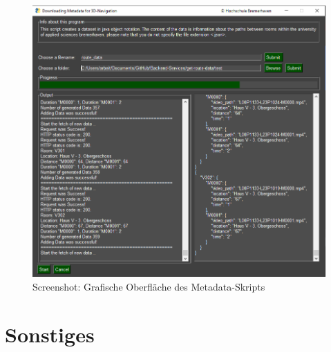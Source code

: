 \begin{figure}[H]
    \includegraphics[width=\textwidth]{Figures/3DNavigator/create_metadata_pic_Fertig.png}
    \caption{Screenshot: Grafische Oberfläche des Metadata-Skripts}
    \label{fig:integration}
    \centering
\end{figure}\vspace{-2.5mm}


\section{Sonstiges}
